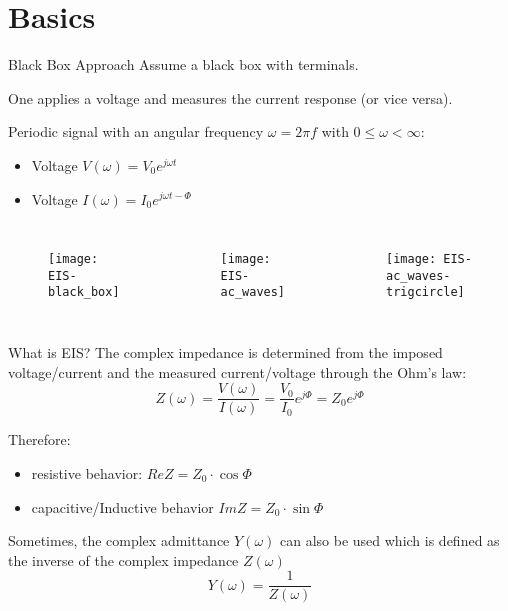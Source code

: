 \documentclass[10pt,compress,handout]{beamer}
\begin{document}
\section{Basics}
    \begin{frame}{Black Box Approach}
        Assume a black box with terminals.

        One applies a voltage and measures the current response (or vice versa).

        Periodic signal with an angular frequency $\omega = 2\pi f$
        with $0 \le \omega < \infty$:
        \begin{itemize}
            \item Voltage $V(\omega) = V_0 e^{j \omega t}$  
            \item Voltage $I(\omega) = I_0 e^{j \omega t - \Phi}$  
        \end{itemize}
        
        \begin{columns}
            \centering
            \centering
                \begin{figure}[h]
                    \texttt{[image: EIS-black\_box]}
                \end{figure}
            \centering
                \begin{figure}
                    \texttt{[image: EIS-ac\_waves]}
                \end{figure}
            \centering
                \begin{figure}
                    \texttt{[image: EIS-ac\_waves-trigcircle]}
                \end{figure}
        \end{columns}
    \end{frame}
    
    \begin{frame}{What is EIS?}
        The complex impedance is determined from the imposed voltage/current and the measured
        current/voltage through the Ohm's law:
        $$ Z(\omega) = \frac{V(\omega)}{I(\omega)} = \frac{V_0}{I_0} e^{j \Phi} = Z_0 e^{j\Phi}$$

        Therefore:
        \begin{itemize}
            \item  resistive behavior: $ReZ=Z_0 \cdot \cos \Phi$
            \item  capacitive/Inductive behavior $ImZ=Z_0 \cdot \sin \Phi$
        \end{itemize}
        
        Sometimes, the complex admittance $Y(\omega)$ can also be used which is defined as the inverse of the
        complex impedance $Z(\omega)$ 
        $$Y(\omega)=\frac{1}{Z(\omega)}$$
    \end{frame}
\end{document}
